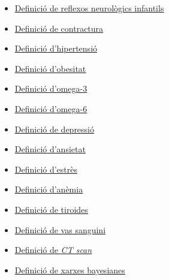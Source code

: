 \documentclass[a4paper,12pt]{report}
\begin{document}
\begin{itemize}
    \item \href{https://www.elsevier.es/es-revista-neurologia-argentina-301-articulo-reflejos-patologicos-S1853002818300429#:~:text=El%20reflejo%20se%20define%20como,pudiendo%20ser%20o%20no%20consciente.}{\underline{Definició de reflexos neurològics infantils}}
    \item \href{https://www.topdoctors.es/diccionario-medico/contractura-muscular}{\underline{Definició de contractura}}
    \item \href{https://www.who.int/es/news-room/fact-sheets/detail/hypertension#:~:text=Se%20habla%20de%20hipertensi%C3%B3n%20cuando,es%20tomarse%20la%20tensi%C3%B3n%20arterial.}{\underline{Definició d'hipertensió}}
    \item \href{https://mutuaterrassa.com/blogs/es/endocrinologia/obesitat}{\underline{Definició d'obesitat}}
    \item \href{https://medlineplus.gov/spanish/ency/patientinstructions/000767.htm}{\underline{Definició d'omega-3}}
    \item \href{https://medlineplus.gov/spanish/druginfo/natural/496.html}{\underline{Definició d'omega-6}}
    \item \href{https://www.cun.es/enfermedades-tratamientos/enfermedades/depresion}{\underline{Definició de depressió}}
    \item \href{https://medlineplus.gov/spanish/anxiety.html#:~:text=¿Qué%20es%20la%20ansiedad%3F,una%20reacción%20normal%20al%20estrés.}{\underline{Definició d'ansietat}}
    \item \href{https://medlineplus.gov/spanish/ency/article/003211.htm#:~:text=El%20estrés%20es%20un%20sentimiento,a%20un%20desafío%20o%20demanda.}{\underline{Definició d'estrès}}
    \item \href{https://www.nhlbi.nih.gov/es/salud/anemia#:~:text=La%20anemia%20es%20una%20afección,se%20sienta%20cansado%20o%20débil.}{\underline{Definició d'anèmia}}
    \item \href{https://medlineplus.gov/spanish/thyroiddiseases.html#:~:text=La%20tiroides%20es%20una%20glándula,de%20sus%20funciones%20más%20importantes.}{\underline{Definició de tiroides}}
    \item \href{https://www.cancer.gov/espanol/publicaciones/diccionarios/diccionario-cancer/def/vaso-sanguineo}{\underline{Definició de vas sanguini}}
    \item \href{https://www.nhs.uk/conditions/ct-scan/}{\underline{Definició de \textit{CT scan}}}
    \item \href{https://vinculando.org/articulos/redes-bayesianas.html}{\underline{Definició de xarxes bayesianes}}

\end{itemize}
\end{document}

